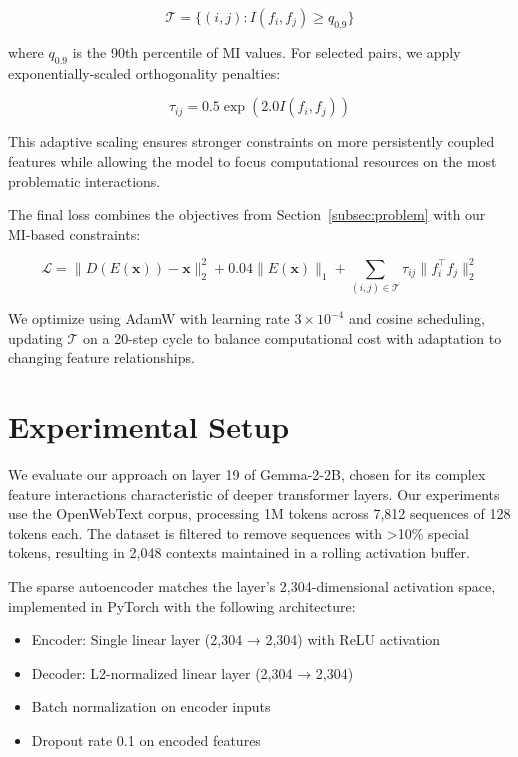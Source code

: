 \documentclass{article} %
\begin{document}
\begin{equation}
    \mathcal{T} = \{(i,j) : I(f_i, f_j) \geq q_{0.9}\}
\end{equation}

where $q_{0.9}$ is the 90th percentile of MI values. For selected pairs, we apply exponentially-scaled orthogonality penalties:

\begin{equation}
    \tau_{ij} = 0.5 \exp(2.0 I(f_i, f_j))
\end{equation}

This adaptive scaling ensures stronger constraints on more persistently coupled features while allowing the model to focus computational resources on the most problematic interactions.

The final loss combines the objectives from Section~\ref{subsec:problem} with our MI-based constraints:

\begin{equation}
    \mathcal{L} = \|D(E(\mathbf{x})) - \mathbf{x}\|_2^2 + 0.04\|E(\mathbf{x})\|_1 + \sum_{(i,j) \in \mathcal{T}} \tau_{ij} \|f_i^\top f_j\|_2^2
\end{equation}

We optimize using AdamW with learning rate $3\times10^{-4}$ and cosine scheduling, updating $\mathcal{T}$ on a 20-step cycle to balance computational cost with adaptation to changing feature relationships.

\section{Experimental Setup}
\label{sec:experimental}

We evaluate our approach on layer 19 of Gemma-2-2B, chosen for its complex feature interactions characteristic of deeper transformer layers. Our experiments use the OpenWebText corpus, processing 1M tokens across 7,812 sequences of 128 tokens each. The dataset is filtered to remove sequences with >10\% special tokens, resulting in 2,048 contexts maintained in a rolling activation buffer.

The sparse autoencoder matches the layer's 2,304-dimensional activation space, implemented in PyTorch with the following architecture:
\begin{itemize}
    \item Encoder: Single linear layer (2,304 → 2,304) with ReLU activation
    \item Decoder: L2-normalized linear layer (2,304 → 2,304)
    \item Batch normalization on encoder inputs
    \item Dropout rate 0.1 on encoded features
\end{itemize}
\end{document}
